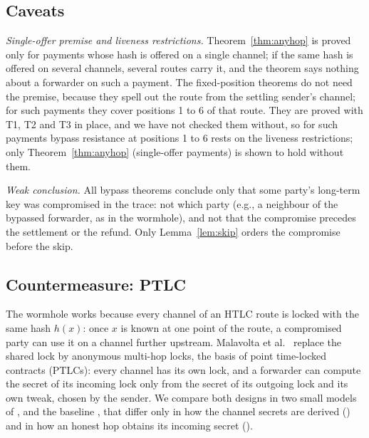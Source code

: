 \subsection{Caveats}\label{sec:bypass-caveats}

\emph{Single-offer premise and liveness restrictions.} Theorem~\ref{thm:anyhop} is proved only
for payments whose hash is offered on a single channel; if the same hash is offered on several
channels, several routes carry it, and the theorem says nothing about a forwarder on such a
payment. The fixed-position theorems do not need the premise, because they spell out the route
from the settling sender's channel; for such payments they cover positions 1 to 6 of that
route. They are proved with T1, T2 and T3 in place, and we have not checked them without, so for
such payments bypass resistance at positions 1 to 6 rests on the liveness restrictions; only
Theorem~\ref{thm:anyhop} (single-offer payments) is shown to hold without them.

\emph{Weak conclusion.} All bypass theorems conclude only that some party's long-term key was
compromised in the trace: not which party (e.g., a neighbour of the bypassed
forwarder, as in the wormhole), and not that the compromise precedes the settlement or the
refund. Only Lemma~\ref{lem:skip} orders the compromise before the skip.

\subsection{Countermeasure: PTLC}\label{sec:ptlc}

The wormhole works because every channel of an HTLC route is locked with the same hash $h(x)$:
once $x$ is known at one point of the route, a compromised party can use it on a channel further
upstream. Malavolta et al.~\cite{malavolta2019} replace the shared lock by anonymous multi-hop
locks, the basis of point time-locked contracts (PTLCs): every channel has its own lock, and a
forwarder can compute the secret of its incoming lock only from the secret of its outgoing lock
and its own tweak, chosen by the sender. We compare both designs in two small models of
,  and the baseline , that differ only in
how the channel secrets are derived () and in how an honest hop obtains its
incoming secret ().


